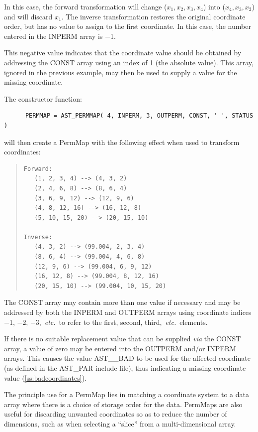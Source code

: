 \documentclass[twoside,11pt]{article}
\newcommand{\secref}[1]{\S\ref{#1}}
\renewcommand{\secref}[1]{\ref{#1}}
\begin{document}
In this case, the forward transformation will change
($x_1,x_2,x_3,x_4$) into ($x_4,x_3,x_2$) and will discard $x_1$. The
inverse transformation restores the original coordinate order, but has
no value to assign to the first coordinate. In this case, the number
entered in the INPERM array is $-$1.

This negative value indicates that the coordinate value should be
obtained by addressing the CONST array using an index of 1 (the
absolute value). This array, ignored in the previous example, may then
be used to supply a value for the missing coordinate.

The constructor function:

\small
\begin{verbatim}
      PERMMAP = AST_PERMMAP( 4, INPERM, 3, OUTPERM, CONST, ' ', STATUS )
\end{verbatim}
\normalsize

will then create a PermMap with the following effect when used to
transform coordinates:

\begin{quote}
\begin{verbatim}
Forward:
   (1, 2, 3, 4) --> (4, 3, 2)
   (2, 4, 6, 8) --> (8, 6, 4)
   (3, 6, 9, 12) --> (12, 9, 6)
   (4, 8, 12, 16) --> (16, 12, 8)
   (5, 10, 15, 20) --> (20, 15, 10)

Inverse:
   (4, 3, 2) --> (99.004, 2, 3, 4)
   (8, 6, 4) --> (99.004, 4, 6, 8)
   (12, 9, 6) --> (99.004, 6, 9, 12)
   (16, 12, 8) --> (99.004, 8, 12, 16)
   (20, 15, 10) --> (99.004, 10, 15, 20)
\end{verbatim}
\end{quote}

The CONST array may contain more than one value if necessary and may
be addressed by both the INPERM and OUTPERM arrays using coordinate
indices $-$1, $-$2, $-$3,~{\em{etc.}}\ to refer to the first, second,
third,~{\em{etc.}}\ elements.

If there is no suitable replacement value that can be supplied
{\em{via}} the CONST array, a value of zero may be entered into the
OUTPERM and/or INPERM arrays. This causes the value AST\_\_BAD to be
used for the affected coordinate (as defined in the AST\_PAR include
file), thus indicating a missing coordinate value
(\secref{ss:badcoordinates}).

The principle use for a PermMap lies in matching a coordinate system
to a data array where there is a choice of storage order for the data.
PermMaps are also useful for discarding unwanted coordinates so as to
reduce the number of dimensions, such as when selecting a ``slice''
from a multi-dimensional array.
\end{document}
